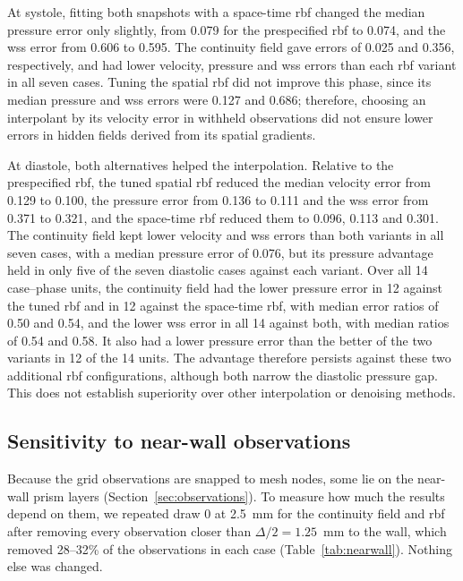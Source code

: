 \documentclass[12pt,a4paper]{article}
\newcommand{\WSS}{\ac{wss}\xspace}
\newcommand{\RBF}{\ac{rbf}\xspace}
\theoremstyle{definition}
\numberwithin{equation}{section}
\begin{document}
At systole, fitting both snapshots with a space-time \RBF changed the median pressure error only slightly, from 0.079 for the prespecified \RBF to 0.074, and the \WSS error from 0.606 to 0.595. The continuity field gave errors of 0.025 and 0.356, respectively, and had lower velocity, pressure and \WSS errors than each \RBF variant in all seven cases. Tuning the spatial \RBF did not improve this phase, since its median pressure and \WSS errors were 0.127 and 0.686; therefore, choosing an interpolant by its velocity error in withheld observations did not ensure lower errors in hidden fields derived from its spatial gradients.

At diastole, both alternatives helped the interpolation. Relative to the prespecified \RBF, the tuned spatial \RBF reduced the median velocity error from 0.129 to 0.100, the pressure error from 0.136 to 0.111 and the \WSS error from 0.371 to 0.321, and the space-time \RBF reduced them to 0.096, 0.113 and 0.301. The continuity field kept lower velocity and \WSS errors than both variants in all seven cases, with a median pressure error of 0.076, but its pressure advantage held in only five of the seven diastolic cases against each variant. Over all 14 case--phase units, the continuity field had the lower pressure error in 12 against the tuned \RBF and in 12 against the space-time \RBF, with median error ratios of 0.50 and 0.54, and the lower \WSS error in all 14 against both, with median ratios of 0.54 and 0.58. It also had a lower pressure error than the better of the two variants in 12 of the 14 units. The advantage therefore persists against these two additional \RBF configurations, although both narrow the diastolic pressure gap. This does not establish superiority over other interpolation or denoising methods.




\subsection{Sensitivity to near-wall observations}
\label{sec:nearwall}
Because the grid observations are snapped to mesh nodes, some lie on the near-wall prism layers (Section~\ref{sec:observations}). To measure how much the results depend on them, we repeated draw 0 at 2.5~mm for the continuity field and \RBF after removing every observation closer than $\Delta/2=1.25$~mm to the wall, which removed 28--32\% of the observations in each case (Table~\ref{tab:nearwall}). Nothing else was changed.
\end{document}
